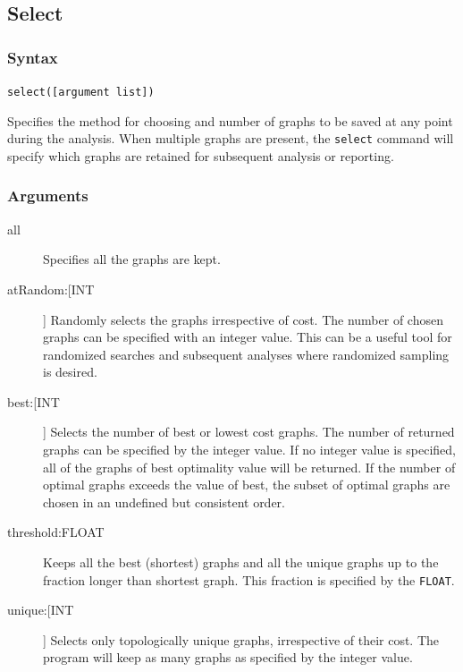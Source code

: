 \subsection{Select}
	\subsubsection{Syntax}
		\texttt{select([argument list])}
	
	\begin{phygdescription}
		{Specifies the method for choosing and number of graphs to be saved at any point 
		during the analysis. When multiple graphs are present, the \texttt{select} command 
		will specify which graphs are retained for subsequent analysis or reporting.}
	\end{phygdescription}
				
	\subsubsection{Arguments}
		\begin{description}
			\item[all] Specifies all the graphs are kept.
		
			\item[atRandom:[INT]] Randomly selects the graphs irrespective of cost. The 
			number of chosen graphs can be specified with an integer value. This can 
			be a useful tool for randomized searches and subsequent analyses where 
			randomized sampling is desired.
			
			\item[best:[INT]] Selects the number of best or lowest cost graphs. The number 
			of returned graphs can be specified by the integer value. If no integer value is 
			specified, all of the graphs of best optimality value will be returned. If the number 
			of optimal graphs exceeds the value of best, the subset of optimal graphs are 
			chosen in an undefined but consistent order.
							
			\item[threshold:FLOAT] Keeps all the best (shortest) graphs and all the unique 
			graphs up to the fraction longer than shortest graph. This fraction is specified by 
			the \texttt{FLOAT}.
			
			\item[unique:[INT]] Selects only topologically unique graphs, irrespective of their
			cost. The program will keep as many graphs as specified by the integer value.
		\end{description}

